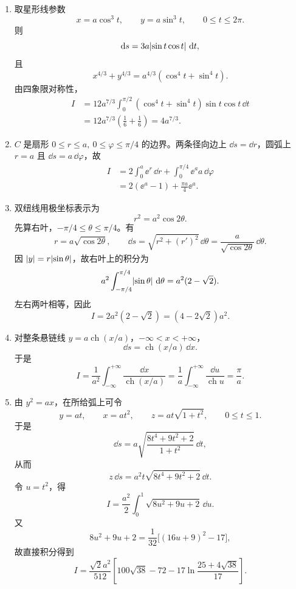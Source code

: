 \begin{xsolution}
\begin{enumerate}[label=(\arabic*)]
\item 取星形线参数
\[
  x=a\cos^3 t,\qquad y=a\sin^3 t,\qquad 0\le t\le2\pi.
\]
则
\[
  \mathop{}\!\mathrm{d} s=3a\lvert\sin t\cos t\rvert\,\mathop{}\!\mathrm{d} t,
\]
且
\[
  x^{4/3}+y^{4/3}=a^{4/3}(\cos^4t+\sin^4t).
\]
由四象限对称性，
\begin{align*}
  I
  &=12a^{7/3}\int_0^{\pi/2}(\cos^4t+\sin^4t)\sin t\cos t\,\dd t\\
  &=12a^{7/3}\left(\frac16+\frac16\right)
   =4a^{7/3}.
\end{align*}

\item $C$ 是扇形 $0\le r\le a,\ 0\le\varphi\le\pi/4$ 的边界。两条径向边上 $\dd s=\dd r$，圆弧上 $r=a$ 且 $\dd s=a\,\dd\varphi$，故
\begin{align*}
  I
  &=2\int_0^a\ee^r\,\dd r
    +\int_0^{\pi/4}\ee^a a\,\dd\varphi\\
  &=2(\ee^a-1)+\frac{\pi a}{4}\ee^a.
\end{align*}

\item 双纽线用极坐标表示为
\[
  r^2=a^2\cos2\theta.
\]
先算右叶，$-\pi/4\le\theta\le\pi/4$。有
\[
  r=a\sqrt{\cos2\theta},\qquad
  \dd s=\sqrt{r^2+(r')^2}\,\dd\theta
  =\frac{a}{\sqrt{\cos2\theta}}\,\dd\theta.
\]
因 $\lvert y\rvert=r\lvert\sin\theta\rvert$，故右叶上的积分为
\[
  a^2\int_{-\pi/4}^{\pi/4}\lvert\sin\theta\rvert\,\mathop{}\!\mathrm{d}\theta
  =a^2(2-\sqrt2).
\]
左右两叶相等，因此
\[
  I=2a^2(2-\sqrt2)=(4-2\sqrt2)a^2.
\]

\item 对整条悬链线 $y=a\operatorname{ch}(x/a)$，$-\infty<x<+\infty$，
\[
  \dd s=\operatorname{ch}(x/a)\,\dd x.
\]
于是
\[
  I=\frac1{a^2}\int_{-\infty}^{+\infty}\frac{\dd x}{\operatorname{ch}(x/a)}
  =\frac1a\int_{-\infty}^{+\infty}\frac{\dd u}{\operatorname{ch}u}
  =\frac\pi a.
\]

\item 由 $y^2=ax$，在所给弧上可令
\[
  y=at,\qquad x=at^2,\qquad
  z=at\sqrt{1+t^2},\qquad 0\le t\le1.
\]
于是
\[
  \dd s
  =a\sqrt{\frac{8t^4+9t^2+2}{1+t^2}}\,\dd t,
\]
从而
\[
  z\,\dd s=a^2t\sqrt{8t^4+9t^2+2}\,\dd t.
\]
令 $u=t^2$，得
\[
  I=\frac{a^2}{2}\int_0^1\sqrt{8u^2+9u+2}\,\dd u.
\]
又
\[
  8u^2+9u+2=\frac1{32}\bigl[(16u+9)^2-17\bigr],
\]
故直接积分得到
\[
  I=\frac{\sqrt2a^2}{512}
  \left[
    100\sqrt{38}-72
    -17\ln\frac{25+4\sqrt{38}}{17}
  \right].
\]
\end{enumerate}
\end{xsolution}

